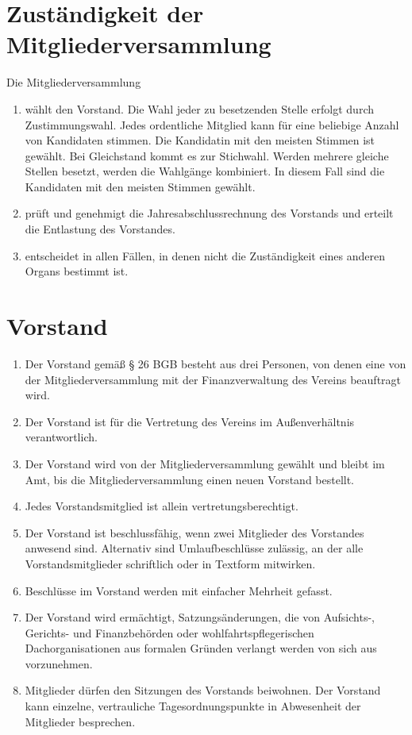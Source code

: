 \documentclass[a4paper, 12pt]{scrartcl}
\begin{document}
\section{Zuständigkeit der Mitgliederversammlung}
Die Mitgliederversammlung
\begin{enumerate}
  \item wählt den Vorstand. Die Wahl jeder zu besetzenden Stelle erfolgt durch Zustimmungswahl. Jedes ordentliche Mitglied kann für eine beliebige Anzahl von Kandidaten stimmen. Die Kandidatin mit den meisten Stimmen ist gewählt. Bei Gleichstand kommt es zur Stichwahl. Werden mehrere gleiche Stellen besetzt, werden die Wahlgänge kombiniert. In diesem Fall sind die Kandidaten mit den meisten Stimmen gewählt.
  \item prüft und genehmigt die Jahresabschlussrechnung des Vorstands und erteilt die Entlastung des Vorstandes.
  \item entscheidet in allen Fällen, in denen nicht die Zuständigkeit eines anderen Organs bestimmt ist.
\end{enumerate}

\section{Vorstand}
\begin{enumerate}
  \item Der Vorstand gemäß § 26 BGB besteht aus drei Personen, von denen eine von der Mitgliederversammlung mit der Finanzverwaltung des Vereins beauftragt wird.
  \item Der Vorstand ist für die Vertretung des Vereins im Außenverhältnis verantwortlich.
  \item Der Vorstand wird von der Mitgliederversammlung gewählt und bleibt im Amt, bis die Mitgliederversammlung einen neuen Vorstand bestellt.
  \item Jedes Vorstandsmitglied ist allein vertretungsberechtigt.
  \item Der Vorstand ist beschlussfähig, wenn zwei Mitglieder des Vorstandes anwesend sind. Alternativ sind Umlaufbeschlüsse zulässig, an der alle Vorstandsmitglieder schriftlich oder in Textform mitwirken.
  \item Beschlüsse im Vorstand werden mit einfacher Mehrheit gefasst.
  \item Der Vorstand wird ermächtigt, Satzungsänderungen, die von Aufsichts-, Gerichts- und Finanzbehörden oder wohlfahrtspflegerischen Dachorganisationen aus formalen Gründen verlangt werden von sich aus vorzunehmen.
  \item Mitglieder dürfen den Sitzungen des Vorstands beiwohnen. Der Vorstand kann einzelne, vertrauliche Tagesordnungspunkte in Abwesenheit der Mitglieder besprechen.
\end{enumerate}
\end{document}
